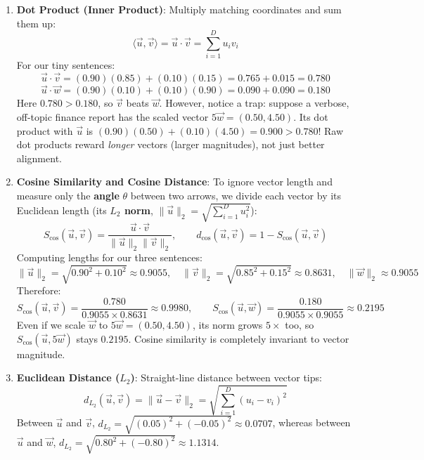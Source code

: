 \begin{enumerate}[leftmargin=18pt]
  \item \textbf{Dot Product (Inner Product)}: Multiply matching coordinates and sum them up:
  \begin{equation}
  \langle \vec{u}, \vec{v} \rangle = \vec{u} \cdot \vec{v} = \sum_{i=1}^D u_i v_i
  \end{equation}
  For our tiny sentences:
  \[
  \vec{u} \cdot \vec{v} = (0.90)(0.85) + (0.10)(0.15) = 0.765 + 0.015 = 0.780
  \]
  \[
  \vec{u} \cdot \vec{w} = (0.90)(0.10) + (0.10)(0.90) = 0.090 + 0.090 = 0.180
  \]
  Here $0.780 > 0.180$, so $\vec{v}$ beats $\vec{w}$. However, notice a trap: suppose a verbose, off-topic finance report has the scaled vector $5\vec{w} = (0.50, 4.50)$. Its dot product with $\vec{u}$ is $(0.90)(0.50) + (0.10)(4.50) = 0.900 > 0.780$! Raw dot products reward \emph{longer} vectors (larger magnitudes), not just better alignment.

  \item \textbf{Cosine Similarity and Cosine Distance}: To ignore vector length and measure only the \textbf{angle} $\theta$ between two arrows, we divide each vector by its Euclidean length (its \textbf{$L_2$ norm}, $\|\vec{u}\|_2 = \sqrt{\sum_{i=1}^D u_i^2}$):
  \begin{equation}
  S_{\cos}(\vec{u}, \vec{v}) = \frac{\vec{u} \cdot \vec{v}}{\|\vec{u}\|_2 \|\vec{v}\|_2}, \qquad d_{\cos}(\vec{u}, \vec{v}) = 1 - S_{\cos}(\vec{u}, \vec{v})
  \end{equation}
  Computing lengths for our three sentences:
  \[
  \|\vec{u}\|_2 = \sqrt{0.90^2 + 0.10^2} \approx 0.9055, \quad
  \|\vec{v}\|_2 = \sqrt{0.85^2 + 0.15^2} \approx 0.8631, \quad
  \|\vec{w}\|_2 \approx 0.9055
  \]
  Therefore:
  \[
  S_{\cos}(\vec{u}, \vec{v}) = \frac{0.780}{0.9055 \times 0.8631} \approx 0.9980, \qquad
  S_{\cos}(\vec{u}, \vec{w}) = \frac{0.180}{0.9055 \times 0.9055} \approx 0.2195
  \]
  Even if we scale $\vec{w}$ to $5\vec{w} = (0.50, 4.50)$, its norm grows $5\times$ too, so $S_{\cos}(\vec{u}, 5\vec{w})$ stays $0.2195$. Cosine similarity is completely invariant to vector magnitude.

  \item \textbf{Euclidean Distance ($L_2$)}: Straight-line distance between vector tips:
  \begin{equation}
  d_{L_2}(\vec{u}, \vec{v}) = \|\vec{u} - \vec{v}\|_2 = \sqrt{\sum_{i=1}^D (u_i - v_i)^2}
  \end{equation}
  Between $\vec{u}$ and $\vec{v}$, $d_{L_2} = \sqrt{(0.05)^2 + (-0.05)^2} \approx 0.0707$, whereas between $\vec{u}$ and $\vec{w}$, $d_{L_2} = \sqrt{0.80^2 + (-0.80)^2} \approx 1.1314$.
\end{enumerate}

